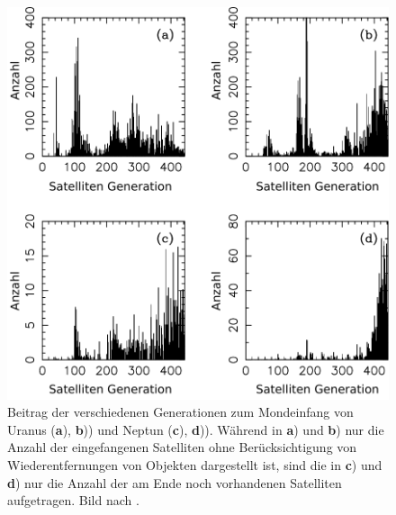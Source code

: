 \documentclass[12pt,a4paper,twoside]{article}
\renewcommand{\cite}{\citep}
\begin{document}
\begin{figure}[tbn]
\centering
\includegraphics[scale=0.4]{img/Nesvorny2007-8}
\caption{Beitrag der verschiedenen Generationen zum Mondeinfang von Uranus (\textbf{a}), \textbf{b})) und Neptun (\textbf{c}), \textbf{d})). Während in \textbf{a}) und \textbf{b}) nur die Anzahl der eingefangenen Satelliten ohne Berücksichtigung von Wiederentfernungen von Objekten dargestellt ist, sind die in  \textbf{c}) und \textbf{d}) nur die Anzahl der am Ende noch vorhandenen Satelliten aufgetragen. Bild nach \cite{Nesvorny2007}.} %
\label{fig:Mondgenerationen}
\end{figure}
\end{document}
